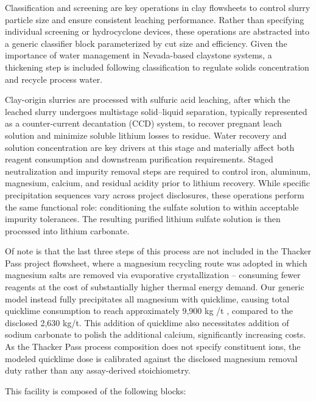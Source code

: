 \documentclass{article}
\renewcommand\_{\textunderscore\allowbreak}
\begin{document}
Classification and screening are key operations in clay flowsheets to control slurry particle size and ensure consistent leaching performance. Rather than specifying individual screening or hydrocyclone devices, these operations are abstracted into a generic classifier block parameterized by cut size and efficiency. Given the importance of water management in Nevada-based claystone systems, a thickening step is included following classification to regulate solids concentration and recycle process water.

Clay-origin slurries are processed with sulfuric acid leaching, after which the leached slurry undergoes multistage solid--liquid separation, typically represented as a counter-current decantation (CCD) system, to recover pregnant leach solution and minimize soluble lithium losses to residue. Water recovery and solution concentration are key drivers at this stage and materially affect both reagent consumption and downstream purification requirements. Staged neutralization and impurity removal steps are required to control iron, aluminum, magnesium, calcium, and residual acidity prior to lithium recovery. While specific precipitation sequences vary across project disclosures, these operations perform the same functional role: conditioning the sulfate solution to within acceptable impurity tolerances. The resulting purified lithium sulfate solution is then processed into lithium carbonate.

Of note is that the last three steps of this process are not included in the Thacker Pass project flowsheet, where a magnesium recycling route was adopted in which magnesium salts are removed via evaporative crystallization -- consuming fewer reagents at the cost of substantially higher thermal energy demand. Our generic model instead fully precipitates all magnesium with quicklime, causing total quicklime consumption to reach approximately 9,900 kg /t , compared to the disclosed 2,630 kg/t. This addition of quicklime also necessitates addition of sodium carbonate to polish the additional calcium, significantly increasing costs. As the Thacker Pass process composition does not specify constituent ions, the modeled quicklime dose is calibrated against the disclosed magnesium removal duty rather than any assay-derived stoichiometry. 

This facility is composed of the following blocks:
\end{document}

